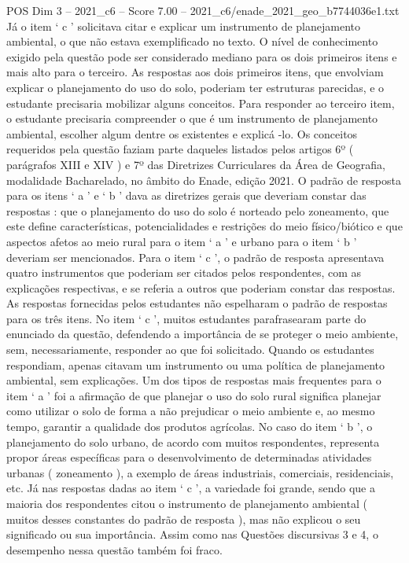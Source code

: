\begin{textsample}{POS Dim 3 – 2021\_c6 – Score 7.00 – 2021\_c6/enade\_2021\_geo\_b7744036e1.txt}
Já o item ‘ c ’ solicitava citar e explicar um instrumento de planejamento ambiental, o que não estava exemplificado no texto.
O nível de conhecimento exigido pela questão pode ser considerado mediano para os dois primeiros itens e mais alto para o terceiro.
As respostas aos dois primeiros itens, que envolviam explicar o planejamento do uso do solo, poderiam ter estruturas parecidas, e o estudante precisaria mobilizar alguns conceitos.
Para responder ao terceiro item, o estudante precisaria compreender o que é um instrumento de planejamento ambiental, escolher algum dentre os existentes e explicá -lo.
Os conceitos requeridos pela questão faziam parte daqueles listados pelos artigos 6º ( parágrafos XIII e XIV ) e 7º das Diretrizes Curriculares da Área de Geografia, modalidade Bacharelado, no âmbito do Enade, edição 2021.
O padrão de resposta para os itens ‘ a ’ e ‘ b ’ dava as diretrizes gerais que deveriam constar das respostas : que o planejamento do uso do solo é norteado pelo zoneamento, que este define características, potencialidades e restrições do meio físico/biótico e que aspectos afetos ao meio rural para o item ‘ a ’ e urbano para o item ‘ b ’ deveriam ser mencionados.
Para o item ‘ c ’, o padrão de resposta apresentava quatro instrumentos que poderiam ser citados pelos respondentes, com as explicações respectivas, e se referia a outros que poderiam constar das respostas.
As respostas fornecidas pelos estudantes não espelharam o padrão de respostas para os três itens.
No item ‘ c ’, muitos estudantes parafrasearam parte do enunciado da questão, defendendo a importância de se proteger o meio ambiente, sem, necessariamente, responder ao que foi solicitado.
Quando os estudantes respondiam, apenas citavam um instrumento ou uma política de planejamento ambiental, sem explicações.
Um dos tipos de respostas mais frequentes para o item ‘ a ’ foi a afirmação de que planejar o uso do solo rural significa planejar como utilizar o solo de forma a não prejudicar o meio ambiente e, ao mesmo tempo, garantir a qualidade dos produtos agrícolas.
No caso do item ‘ b ’, o planejamento do solo urbano, de acordo com muitos respondentes, representa propor áreas específicas para o desenvolvimento de determinadas atividades urbanas ( zoneamento ), a exemplo de áreas industriais, comerciais, residenciais, etc.
Já nas respostas dadas ao item ‘ c ’, a variedade foi grande, sendo que a maioria dos respondentes citou o instrumento de planejamento ambiental ( muitos desses constantes do padrão de resposta ), mas não explicou o seu significado ou sua importância.
Assim como nas Questões discursivas 3 e 4, o desempenho nessa questão também foi fraco.

\end{textsample}
